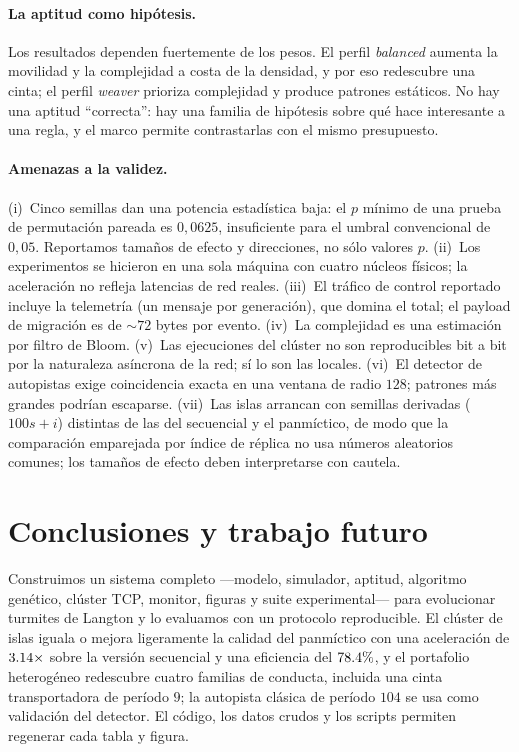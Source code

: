 \documentclass[11pt,a4paper]{article}
\begin{document}
\paragraph{La aptitud como hip\'otesis.}
Los resultados dependen fuertemente de los pesos.  El perfil \emph{balanced}
aumenta la movilidad y la complejidad a costa de la densidad, y por eso
redescubre una cinta; el perfil \emph{weaver} prioriza complejidad y produce
patrones est\'aticos.  No hay una aptitud ``correcta'': hay una familia de
hip\'otesis sobre qu\'e hace interesante a una regla, y el marco permite
contrastarlas con el mismo presupuesto.

\paragraph{Amenazas a la validez.}
(i)~Cinco semillas dan una potencia estad\'istica baja: el $p$ m\'inimo de una
prueba de permutaci\'on pareada es $0{,}0625$, insuficiente para el umbral
convencional de $0{,}05$.  Reportamos tama\~nos de efecto y direcciones, no
s\'olo valores $p$.  (ii)~Los experimentos se hicieron en una sola m\'aquina con
cuatro n\'ucleos f\'isicos; la aceleraci\'on no refleja latencias de red reales.
(iii)~El tr\'afico de control reportado incluye la telemetr\'ia (un mensaje por
generaci\'on), que domina el total; el payload de migraci\'on es de $\sim\!72$
bytes por evento.  (iv)~La complejidad es una estimaci\'on por filtro de Bloom.
(v)~Las ejecuciones del cl\'uster no son reproducibles bit a bit por la
naturaleza as\'incrona de la red; s\'i lo son las locales.  (vi)~El detector de
autopistas exige coincidencia exacta en una ventana de radio $128$; patrones
m\'as grandes podr\'ian escaparse.  (vii)~Las islas arrancan con semillas
derivadas ($100s+i$) distintas de las del secuencial y el panm\'ictico, de modo
que la comparaci\'on emparejada por \'indice de r\'eplica no usa n\'umeros
aleatorios comunes; los tama\~nos de efecto deben interpretarse con cautela.

\section{Conclusiones y trabajo futuro}\label{sec:conclusions}

Construimos un sistema completo ---modelo, simulador, aptitud, algoritmo
gen\'etico, cl\'uster TCP, monitor, figuras y suite experimental--- para evolucionar
turmites de Langton y lo evaluamos con un protocolo reproducible.  El cl\'uster
de islas iguala o mejora ligeramente la calidad del panm\'ictico con una
aceleraci\'on de $3.14\times$ sobre la versi\'on secuencial y una
eficiencia del $78.4\%$, y el portafolio heterog\'eneo redescubre
cuatro familias de conducta, incluida una cinta transportadora de per\'iodo $9$;
la autopista cl\'asica de per\'iodo $104$ se usa como validaci\'on del detector.  El c\'odigo, los
datos crudos y los scripts permiten regenerar cada tabla y figura.
\end{document}
